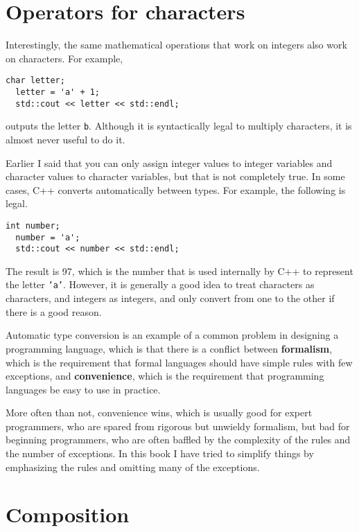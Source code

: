 \section{Operators for characters}

Interestingly, the same mathematical operations that work on
integers also work on characters.  For example,

\begin{lstlisting}[frame=single]
  char letter;
  letter = 'a' + 1;
  std::cout << letter << std::endl;
\end{lstlisting}
%
outputs the letter {\tt b}.  Although it is syntactically legal
to multiply characters, it is almost never useful to do it.

Earlier I said that you can only assign integer values to
integer variables and character values to character variables,
but that is not completely true.  In some cases, C++ converts
automatically between types.  For example, the following is
legal.

\begin{lstlisting}[frame=single]
  int number;
  number = 'a';
  std::cout << number << std::endl;
\end{lstlisting}
%
The result is 97, which is the number that is used internally
by C++ to represent the letter {\tt 'a'}.  However, it is
generally a good idea to treat characters as characters, and
integers as integers, and only convert from one to the other
if there is a good reason.

Automatic type conversion is an example of a common problem in designing a
programming language, which is that there is a conflict between {\bf
formalism}, which is the requirement that formal languages should have
simple rules with few exceptions, and {\bf convenience}, which is the
requirement that programming languages be easy to use in practice.

More often than not, convenience wins, which is usually good for
expert programmers, who are spared from rigorous but unwieldy
formalism, but bad for beginning programmers, who are often baffled
by the complexity of the rules and the number of exceptions.  In this
book I have tried to simplify things by emphasizing the rules and
omitting many of the exceptions.


\section{Composition}

